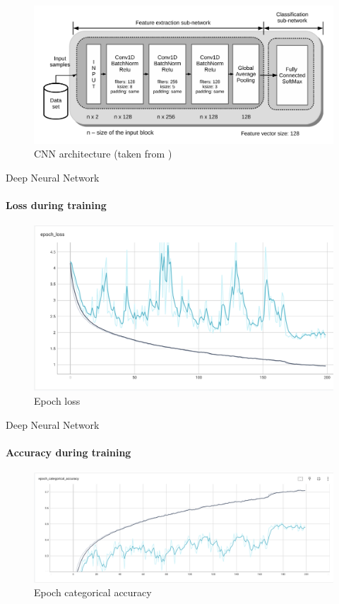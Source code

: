 \documentclass{beamer}
\begin{document}
\begin{frame}
\begin{figure}
    \centering
    \includegraphics[width=\textwidth]{theme/images/architecture.png}
    \caption{CNN architecture (taken from \cite{antalSapiMouseMouseDynamicsbased2021})}
    \label{fig:architecture}
\end{figure}
\end{frame}

\begin{frame}{Deep Neural Network}
\framesubtitle{Loss during training}
\begin{figure}
    \centering
    \includegraphics[width=\textwidth]{epoch_loss.png}
    \caption{Epoch loss}
    \label{fig:epoch_loss}
\end{figure}
\end{frame}

\begin{frame}{Deep Neural Network}
\framesubtitle{Accuracy during training}
\begin{figure}
    \centering
    \includegraphics[width=\textwidth]{epoch_categorical_accuracy.png}
    \caption{Epoch categorical accuracy}
    \label{fig:epoch_categorical_accuracy}
\end{figure}
\end{frame}
\end{document}
